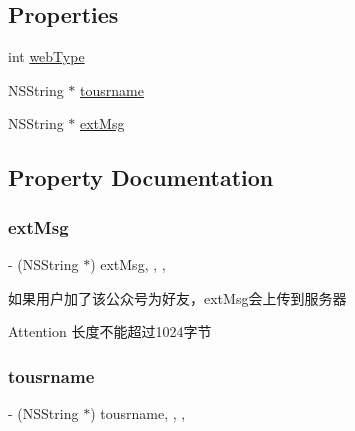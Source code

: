 \subsection*{Properties}
\begin{DoxyCompactItemize}
\item 
int \mbox{\hyperlink{interface_jump_to_biz_webview_req_ab8d9875cfa2b308fb96d76d06527c02b}{web\+Type}}
\item 
N\+S\+String $\ast$ \mbox{\hyperlink{interface_jump_to_biz_webview_req_ad301c878abbefefaf91d3659f7877601}{tousrname}}
\item 
N\+S\+String $\ast$ \mbox{\hyperlink{interface_jump_to_biz_webview_req_a9910d70676f0f751af7a804fc33fa8f4}{ext\+Msg}}
\end{DoxyCompactItemize}


\subsection{Property Documentation}
\mbox{\label{interface_jump_to_biz_webview_req_a9910d70676f0f751af7a804fc33fa8f4}} 
\subsubsection{\texorpdfstring{ext\+Msg}{extMsg}}
{\footnotesize\ttfamily -\/ (N\+S\+String $\ast$) ext\+Msg\hspace{0.3cm}{\ttfamily [read]}, {\ttfamily [write]}, {\ttfamily [nonatomic]}, {\ttfamily [retain]}}

如果用户加了该公众号为好友，ext\+Msg会上传到服务器 \begin{DoxyAttention}{Attention}
长度不能超过1024字节 
\end{DoxyAttention}
\mbox{\label{interface_jump_to_biz_webview_req_ad301c878abbefefaf91d3659f7877601}} 
\subsubsection{\texorpdfstring{tousrname}{tousrname}}
{\footnotesize\ttfamily -\/ (N\+S\+String $\ast$) tousrname\hspace{0.3cm}{\ttfamily [read]}, {\ttfamily [write]}, {\ttfamily [nonatomic]}, {\ttfamily [retain]}}


